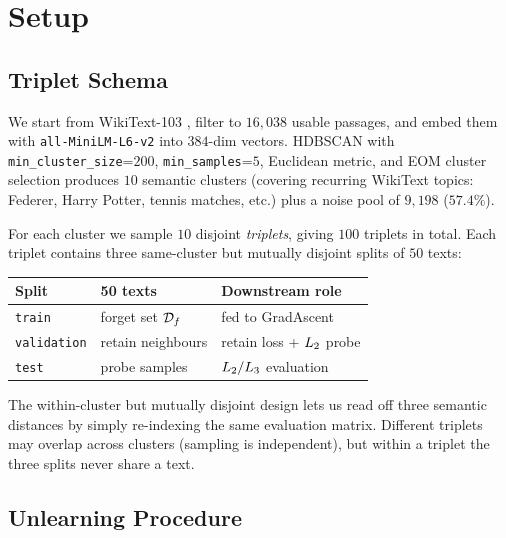 \section{Setup}
\label{sec:setup}

\subsection{Triplet Schema}
\label{sec:triplets}

We start from WikiText-103 \citep{merity2017pointer}, filter to $16{,}038$ usable passages, and embed them with \texttt{all-MiniLM-L6-v2} \citep{wang2020minilmv2} into $384$-dim vectors. HDBSCAN \citep{campello2013density} with \texttt{min\_cluster\_size}{=}$200$, \texttt{min\_samples}{=}$5$, Euclidean metric, and EOM cluster selection produces $10$ semantic clusters (covering recurring WikiText topics: Federer, Harry Potter, tennis matches, etc.) plus a noise pool of $9{,}198$ ($57.4\%$).

For each cluster we sample $10$ disjoint \emph{triplets}, giving $100$ triplets in total. Each triplet contains three same-cluster but mutually disjoint splits of $50$ texts:
\begin{center}
\small
\begin{tabular}{@{}lll@{}}
    \toprule
    Split & 50 texts & Downstream role \\
    \midrule
    \texttt{train}      & forget set $\mathcal{D}_f$              & fed to GradAscent \\
    \texttt{validation} & retain neighbours             & retain loss + $L_2$ probe \\
    \texttt{test}       & probe samples                 & $L_2 / L_3$ evaluation \\
    \bottomrule
\end{tabular}
\end{center}
The within-cluster but mutually disjoint design lets us read off three semantic distances by simply re-indexing the same evaluation matrix. Different triplets may overlap across clusters (sampling is independent), but within a triplet the three splits never share a text.

\subsection{Unlearning Procedure}
\label{sec:unlearn}

